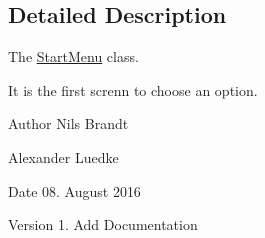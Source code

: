 \subsection{Detailed Description}
The \hyperlink{classStartMenu}{Start\-Menu} class. 

It is the first screnn to choose an option.

\begin{DoxyAuthor}{Author}
Nils Brandt 

Alexander Luedke
\end{DoxyAuthor}
\begin{DoxyDate}{Date}
08. August 2016
\end{DoxyDate}
\begin{DoxyVersion}{Version}
1. Add Documentation 
\end{DoxyVersion}
